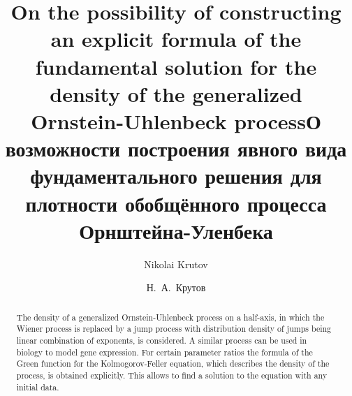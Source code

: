 \begin{englishtitle} %
\title{On the possibility of constructing an explicit formula of the fundamental solution for the density of the generalized Ornstein-Uhlenbeck process}
\author{Nikolai Krutov
}

\maketitle

\begin{abstract}
The density of a generalized Ornstein-Uhlenbeck process on a half-axis, in which the Wiener process is replaced by a jump process with distribution density of jumps being linear combination of exponents, is considered. A similar process can be used in biology to model gene expression. For certain parameter ratios the formula of the Green function for the Kolmogorov-Feller equation,
which describes the density of the process, is obtained explicitly. This allows to find a solution to the equation with any initial data.

\end{abstract}
\end{englishtitle}


\iffalse
%
%


\documentclass[12pt]{llncs}


\usepackage{iftex}

\ifPDFTeX
\usepackage[T2A]{fontenc}
\usepackage[utf8]{inputenc} %
\usepackage[english,russian]{babel}
\fi

\usepackage{todonotes}

\usepackage[russian]{nla}


\fi


\title{О возможности построения явного вида фундаментального решения для плотности обобщённого процесса Орнштейна-Уленбека}
\author{Н.~А.~Крутов
}

